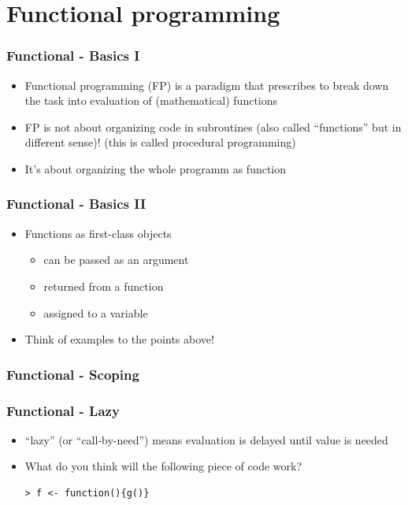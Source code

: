 \documentclass[bigger]{beamer}
\begin{document}
\section{Functional programming}
\label{sec-3}
\begin{frame}
\frametitle{Functional - Basics I}
\label{sec-3-1}
\begin{itemize}

\item Functional programming (FP) is a paradigm that prescribes to break down the task into evaluation of (mathematical) functions
\label{sec-3-1-1}%

\item FP is not about organizing code in subroutines (also called ``functions'' but in different sense)! (this is called procedural programming)
\label{sec-3-1-2}%

\item It's about organizing the whole programm as function
\label{sec-3-1-3}%
\end{itemize} %
\end{frame}
\begin{frame}
\frametitle{Functional - Basics II}
\label{sec-3-2}
\begin{itemize}

\item Functions as first-class objects
\label{sec-3-2-1}%
\begin{itemize}

\item can be passed as an argument
\label{sec-3-2-1-1}%

\item returned from a function
\label{sec-3-2-1-2}%

\item assigned to a variable
\label{sec-3-2-1-3}%
\end{itemize} %

\item Think of examples to the points above!
\label{sec-3-2-2}%
\end{itemize} %
\end{frame}
\begin{frame}
\frametitle{Functional - Scoping}
\label{sec-3-3}
\end{frame}
\begin{frame}[fragile]
\frametitle{Functional - Lazy}
\label{sec-3-4}
\begin{itemize}

\item ``lazy'' (or ``call-by-need'') means evaluation is delayed until value is needed
\label{sec-3-4-1}%

\item What do you think will the following piece of code work?\\
\label{sec-3-4-2}%
\begin{verbatim}
> f <- function(){g()}
\end{verbatim}


\end{itemize} %
\end{frame}
\end{document}
